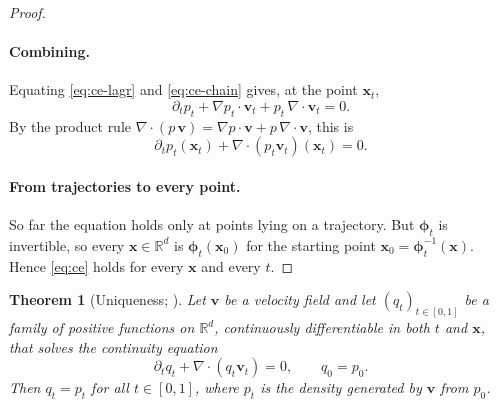 \documentclass[11pt,a4paper]{article}
\numberwithin{equation}{section}     %
\theoremstyle{plain}        %
\newtheorem{theorem}{Theorem}[section]
\theoremstyle{definition}   %
\theoremstyle{remark}       %
\begin{document}
\begin{proof}
\paragraph{Combining.} Equating \eqref{eq:ce-lagr} and \eqref{eq:ce-chain} gives, at the point $\mathbf{x}_t$,
\[
\partial_t p_t + \nabla p_t\cdot\mathbf{v}_t + p_t\,\nabla\cdot\mathbf{v}_t = 0 .
\]
By the product rule $\nabla\cdot(p\,\mathbf{v})=\nabla p\cdot\mathbf{v}+p\,\nabla\cdot\mathbf{v}$, this is
\[
\partial_t p_t(\mathbf{x}_t) + \nabla\cdot\left(p_t\mathbf{v}_t\right)(\mathbf{x}_t) = 0 .
\]

\paragraph{From trajectories to every point.} So far the equation holds only at points lying on a trajectory. But $\boldsymbol{\phi}_t$ is invertible, so every $\mathbf{x}\in\mathbb{R}^d$ is $\boldsymbol{\phi}_t(\mathbf{x}_0)$ for the starting point $\mathbf{x}_0=\boldsymbol{\phi}_t^{-1}(\mathbf{x})$. Hence \eqref{eq:ce} holds for every $\mathbf{x}$ and every $t$.
\end{proof}

\begin{theorem}[Uniqueness; \citealp{ambrosio2008}]\label{thm:unique}
Let $\mathbf{v}$ be a velocity field and let $(q_t)_{t\in[0,1]}$ be a family of positive functions on $\mathbb{R}^d$, continuously differentiable in both $t$ and $\mathbf{x}$, that solves the continuity equation
\[
\partial_t q_t+\nabla\cdot\left(q_t\mathbf{v}_t\right)=0,\qquad q_0=p_0 .
\]
Then $q_t=p_t$ for all $t\in[0,1]$, where $p_t$ is the density generated by $\mathbf{v}$ from $p_0$.
\end{theorem}
\end{document}
